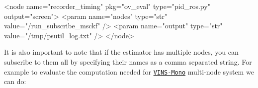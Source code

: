 \begin{DoxyCode}
<\textcolor{keywordtype}{node} \textcolor{keyword}{name}=\textcolor{stringliteral}{"recorder\_timing"} \textcolor{keyword}{pkg}=\textcolor{stringliteral}{"ov\_eval"} \textcolor{keyword}{type}=\textcolor{stringliteral}{"pid\_ros.py"} \textcolor{keyword}{output}=\textcolor{stringliteral}{"screen"}>
    <\textcolor{keywordtype}{param} \textcolor{keyword}{name}=\textcolor{stringliteral}{"nodes"}   \textcolor{keyword}{type}=\textcolor{stringliteral}{"str"} \textcolor{keyword}{value}=\textcolor{stringliteral}{"/run\_subscribe\_msckf"} />
    <\textcolor{keywordtype}{param} \textcolor{keyword}{name}=\textcolor{stringliteral}{"output"}  \textcolor{keyword}{type}=\textcolor{stringliteral}{"str"} \textcolor{keyword}{value}=\textcolor{stringliteral}{"/tmp/psutil\_log.txt"} />
</\textcolor{keywordtype}{node}>
\end{DoxyCode}


It is also important to note that if the estimator has multiple nodes, you can subscribe to them all by specifying their names as a comma separated string. For example to evaluate the computation needed for \href{https://github.com/HKUST-Aerial-Robotics/VINS-Mono/blob/master/vins_estimator/launch/euroc.launch}{\tt V\+I\+N\+S-\/\+Mono} multi-\/node system we can do\+:


